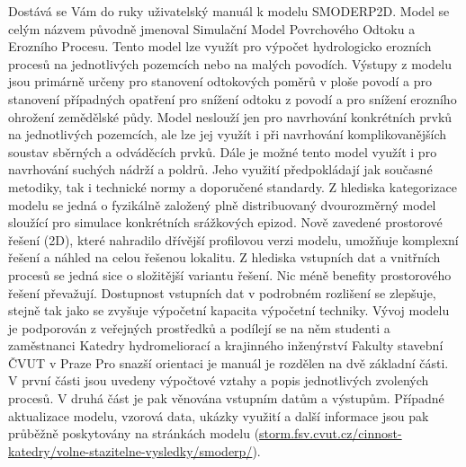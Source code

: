 


Dostává se Vám do ruky uživatelský manuál k modelu SMODERP2D. Model se celým názvem původně jmenoval Simulační Model Povrchového Odtoku a Erozního Procesu. Tento model lze využít pro výpočet hydrologicko erozních procesů na jednotlivých pozemcích nebo na malých povodích. Výstupy z modelu jsou primárně určeny pro stanovení odtokových poměrů v ploše povodí a pro stanovení případných opatření pro snížení odtoku z povodí a pro snížení erozního ohrožení zemědělské půdy. Model neslouží jen pro navrhování konkrétních prvků na jednotlivých pozemcích, ale lze jej využít i při navrhování komplikovanějších soustav sběrných a odváděcích prvků. Dále je možné tento model využít i pro navrhování suchých nádrží a poldrů. Jeho využití předpokládají jak současné metodiky, tak i technické normy a doporučené standardy.
Z hlediska kategorizace modelu se jedná o fyzikálně založený plně distribuovaný dvourozměrný model sloužící pro simulace konkrétních srážkových epizod. Nově zavedené prostorové řešení (2D), které nahradilo dřívější profilovou verzi modelu, umožňuje komplexní řešení a náhled na celou řešenou lokalitu. Z hlediska vstupních dat a vnitřních procesů se jedná sice o složitější variantu řešení. Nic méně benefity prostorového řešení převažují. Dostupnost vstupních dat v podrobném rozlišení se zlepšuje, stejně tak jako se zvyšuje výpočetní kapacita výpočetní techniky.
Vývoj modelu je podporován z veřejných prostředků a podílejí se na něm studenti a zaměstnanci Katedry hydromeliorací a krajinného inženýrství Fakulty stavební ČVUT v Praze
Pro snazší orientaci je manuál je rozdělen na dvě základní části. V první části jsou uvedeny výpočtové vztahy a popis jednotlivých zvolených procesů. V druhá část je pak věnována vstupním datům a výstupům.
Případné aktualizace modelu, vzorová data, ukázky využití a další informace jsou pak průběžně poskytovány na stránkách  modelu
(\href{http://storm.fsv.cvut.cz/cinnost-katedry/volne-stazitelne-vysledky/smoderp/?lang=cz}{storm.fsv.cvut.cz/cinnost-katedry/volne-stazitelne-vysledky/smoderp/}).